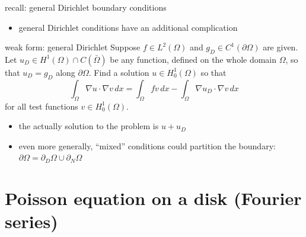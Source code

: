 \documentclass[10pt,
               svgnames,
               hyperref={colorlinks,
                         citecolor=DeepPink4,
                         linkcolor=FireBrick,
                         urlcolor=blue},
               usepdftitle=false]{beamer}
\newcommand{\grad}{\nabla}
\begin{document}
\begin{frame}{recall: general Dirichlet boundary conditions}

\begin{itemize}
\item general Dirichlet conditions have an additional complication
\end{itemize}

\begin{block}{weak form: \alert{general Dirichlet}}
Suppose $f\in L^2(\Omega)$ and $g_D\in C^1(\partial\Omega)$ are given.  Let $u_D \in H^1(\Omega) \cap C(\bar\Omega)$ be any function, defined on the whole domain $\Omega$, so that $u_D=g_D$ along $\partial\Omega$.  Find a solution $u\in H_0^1(\Omega)$ so that
    $$\int_\Omega \grad u \cdot \grad v\,dx = \int_\Omega f v\,dx - \int_\Omega \grad u_D \cdot \grad v\,dx$$
for all test functions $v\in H_0^1(\Omega)$.
\end{block}

\begin{itemize}
\item the actually solution to the problem is $u+u_D$
\item even more generally, ``mixed'' conditions could partition the boundary: $\partial \Omega = \partial_D \Omega \cup \partial_N \Omega$
\end{itemize}

\end{frame}


\AtBeginSection[] {
    \begin{frame}{Outline}
    \setbeamertemplate{section in toc}[sections numbered]
    \tableofcontents[currentsection]%
    \end{frame}
}


\section{Poisson equation on a disk (Fourier series)}
\end{document}
